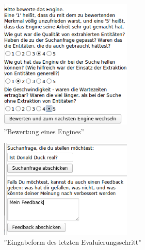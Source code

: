 \begin{figure}
\centering
\includegraphics[width=0.6\textwidth]{Bilder/bewertung-eval.png}
\caption{''Bewertung eines Engines''}
\label{fig:bewertung}
\end{figure}

\begin{figure}
\centering
\includegraphics[width=0.6\textwidth]{Bilder/ende-eval-01.png}
\caption{''Eingabeform des letzten Evaluierungsschritt''}
\label{fig:finish-eval}
\end{figure}
